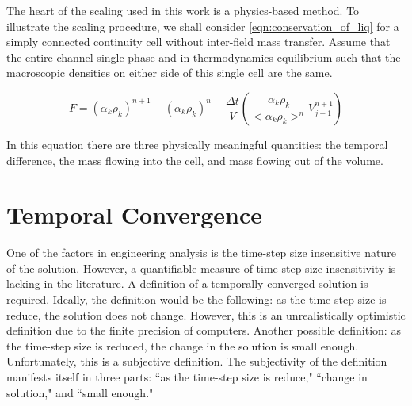 The heart of the scaling used in this work is a physics-based method.
To illustrate the scaling procedure, we shall consider \eqref{eqn:conservation_of_liq} for a simply connected continuity cell without inter-field mass transfer.
Assume that the entire channel single phase and in thermodynamics equilibrium such that the macroscopic densities on either side of this single cell are the same.

\begin{equation}
F = \left(\alpha_k \rho_k\right)^{n+1} - \left( \alpha_k \rho_k \right)^n - \frac{\Delta t}{V} \left( \frac{\alpha_k \rho_k }{<\alpha_k \rho_k>^n} V^{n+1}_{j-1} \right)
\end{equation}

In this equation there are three physically meaningful quantities: the temporal difference, the mass flowing into the cell, and mass flowing out of the volume. 


\section{Temporal Convergence}
\label{sect:temporal_convergence}

One of the factors in engineering analysis is the time-step size insensitive nature of the solution.
However, a quantifiable measure of time-step size insensitivity is lacking in the literature.
A definition of a temporally converged solution is required.
Ideally, the definition would be the following: as the time-step size is reduce, the solution does not change.
However, this is an unrealistically optimistic definition due to the finite precision of computers.
Another possible definition: as the time-step size is reduced, the change in the solution is small enough.
Unfortunately, this is a subjective definition.
The subjectivity of the definition manifests itself in three parts: ``as the time-step size is reduce," ``change in solution," and ``small enough."


